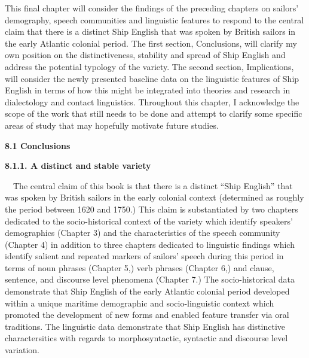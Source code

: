 \begin{styleStandard}
This final chapter will consider the findings of the preceding chapters on sailors’ demography, speech communities and linguistic features to respond to the central claim that there is a distinct Ship English that was spoken by British sailors in the early Atlantic colonial period. The first section, Conclusions, will clarify my own position on the distinctiveness, stability and spread of Ship English and address the potential typology of the variety. The second section, Implications, will consider the newly presented baseline data on the linguistic features of Ship English in terms of how this might be integrated into theories and research in dialectology and contact linguistics. Throughout this chapter, I acknowledge the scope of the work that still needs to be done and attempt to clarify some specific areas of study that may hopefully motivate future studies.
\end{styleStandard}

\begin{styleStandard}
\textbf{8.1 Conclusions}
\end{styleStandard}

\begin{styleStandard}
\textbf{8.1.1. A distinct and stable variety}
\end{styleStandard}

\begin{styleStandard}
\ \ The central claim of this book is that there is a distinct “Ship English” that was spoken by British sailors in the early colonial context (determined as roughly the period between 1620 and 1750.) This claim is substantiated by two chapters dedicated to the socio-historical context of the variety which identify speakers’ demographics (Chapter 3) and the characteristics of the speech community (Chapter 4) in addition to three chapters dedicated to linguistic findings which identify salient and repeated markers of sailors’ speech during this period in terms of noun phrases (Chapter 5,) verb phrases (Chapter 6,) and clause, sentence, and discourse level phenomena (Chapter 7.) The socio-historical data demonstrate that Ship English of the early Atlantic colonial period developed within a unique maritime demographic and socio-linguistic context which promoted the development of new forms and enabled feature transfer via oral traditions. The linguistic data demonstrate that Ship English has distinctive charactersitics with regards to morphosyntactic, syntactic and discourse level variation.
\end{styleStandard}

